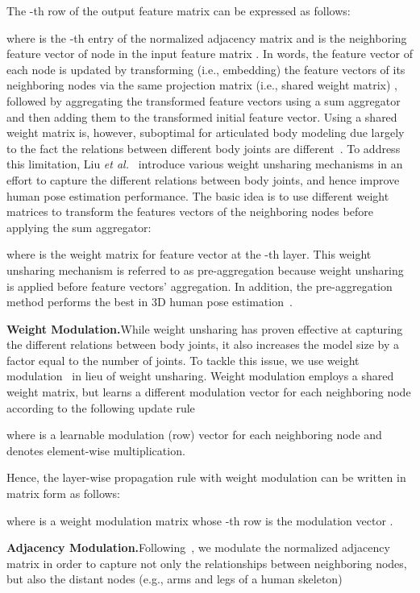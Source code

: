 \documentclass[10pt,journal]{IEEEtran}
\begin{document}
The -th row of the output feature matrix can be expressed as follows:

where  is the -th entry of the normalized adjacency matrix  and  is the neighboring feature vector of node  in the input feature matrix . In words, the feature vector of each node  is updated by transforming (i.e., embedding) the feature vectors of its neighboring nodes via the same projection matrix (i.e., shared weight matrix) , followed by aggregating the transformed feature vectors using a sum aggregator and then adding them to the transformed initial feature vector. Using a shared weight matrix is, however, suboptimal for articulated body modeling due largely to the fact the relations between different body joints are different~\cite{liu2020comprehensive}. To address this limitation, Liu \textit{et al.}~\cite{liu2020comprehensive} introduce various weight unsharing mechanisms in an effort to capture the different relations between body joints, and hence improve human pose estimation performance. The basic idea is to use different weight matrices to transform the features vectors of the neighboring nodes before applying the sum aggregator:

where  is the weight matrix for feature vector  at the -th layer. This weight unsharing mechanism is referred to as pre-aggregation because weight unsharing is applied before feature vectors' aggregation. In addition, the pre-aggregation method performs the best in 3D human pose estimation~\cite{liu2020comprehensive}.
	
\medskip\noindent\textbf{Weight Modulation.}\quad While weight unsharing has proven effective at capturing the different relations between body joints, it also increases the model size by a factor equal to the number of joints. To tackle this issue, we use weight modulation~\cite{zou2021modulated} in lieu of weight unsharing. Weight modulation employs a shared weight matrix, but learns a different modulation vector for each neighboring node  according to the following update rule

where  is a learnable modulation (row) vector for each neighboring node  and  denotes element-wise multiplication.

Hence, the layer-wise propagation rule with weight modulation can be written in matrix form as follows:

where  is a weight modulation matrix whose -th row is the modulation vector .

\medskip\noindent\textbf{Adjacency Modulation.}\quad Following~\cite{zou2021modulated}, we modulate the normalized adjacency matrix in order to capture not only the relationships between neighboring nodes, but also the distant nodes (e.g., arms and legs of a human skeleton)
\end{document}
